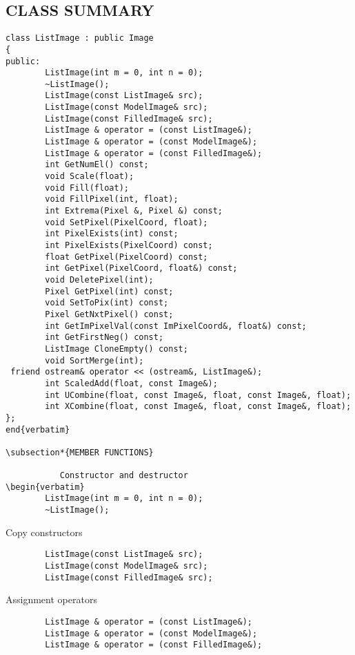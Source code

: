 \subsection*{CLASS SUMMARY}
\begin{verbatim}
class ListImage : public Image
{
public:
        ListImage(int m = 0, int n = 0);
        ~ListImage();
        ListImage(const ListImage& src);
        ListImage(const ModelImage& src);
        ListImage(const FilledImage& src);
        ListImage & operator = (const ListImage&);
        ListImage & operator = (const ModelImage&);
        ListImage & operator = (const FilledImage&);
        int GetNumEl() const;
        void Scale(float);
        void Fill(float);
        void FillPixel(int, float);
        int Extrema(Pixel &, Pixel &) const;
        void SetPixel(PixelCoord, float);
        int PixelExists(int) const;
        int PixelExists(PixelCoord) const;
        float GetPixel(PixelCoord) const;
        int GetPixel(PixelCoord, float&) const;
        void DeletePixel(int);
        Pixel GetPixel(int) const;
        void SetToPix(int) const;
        Pixel GetNxtPixel() const;
        int GetImPixelVal(const ImPixelCoord&, float&) const;
        int GetFirstNeg() const;
        ListImage CloneEmpty() const;
        void SortMerge(int);
 friend ostream& operator << (ostream&, ListImage&);
        int ScaledAdd(float, const Image&);
        int UCombine(float, const Image&, float, const Image&, float);
        int XCombine(float, const Image&, float, const Image&, float);
};
end{verbatim}

\subsection*{MEMBER FUNCTIONS}

           Constructor and destructor
\begin{verbatim}
        ListImage(int m = 0, int n = 0);
        ~ListImage();
\end{verbatim}

           Copy constructors
\begin{verbatim}
        ListImage(const ListImage& src);
        ListImage(const ModelImage& src);
        ListImage(const FilledImage& src);
\end{verbatim}

           Assignment operators
\begin{verbatim}
        ListImage & operator = (const ListImage&);
        ListImage & operator = (const ModelImage&);
        ListImage & operator = (const FilledImage&);
\end{verbatim}

